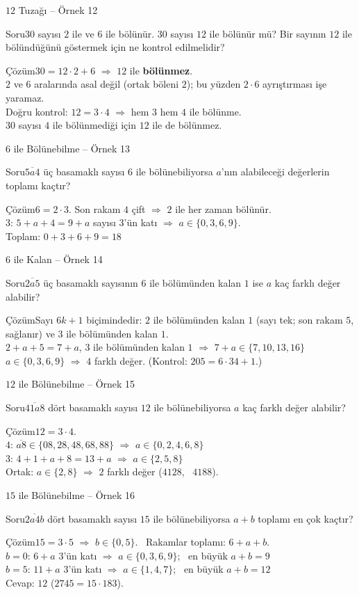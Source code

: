 \documentclass[aspectratio=169,11pt]{beamer}
\newcommand{\soru}[3]{%
\begin{frame}{#1}
  \begin{block}{Soru}\large #2\end{block}
  \pause
  \begin{exampleblock}{Çözüm}\large #3\end{exampleblock}
\end{frame}}
\newcommand{\ab}[1]{\overline{#1}}
\begin{document}
\soru{\(12\) Tuzağı -- Örnek 12}
{\(30\) sayısı \(2\) ile ve \(6\) ile bölünür. \(30\) sayısı \(12\) ile bölünür mü? Bir sayının \(12\) ile bölündüğünü göstermek için ne kontrol edilmelidir?}
{\(30=12\cdot 2+6\) \(\Rightarrow\) \(12\) ile \textbf{bölünmez}.\\[3pt]
\(2\) ve \(6\) aralarında asal değil (ortak böleni \(2\)); bu yüzden \(2\cdot 6\) ayrıştırması işe yaramaz.\\[3pt]
Doğru kontrol: \(12=3\cdot 4\) \(\Rightarrow\) hem \(3\) hem \(4\) ile bölünme.\\
\(30\) sayısı \(4\) ile bölünmediği için \(12\) ile de bölünmez.}

\soru{\(6\) ile Bölünebilme -- Örnek 13}
{\(\ab{5a4}\) üç basamaklı sayısı \(6\) ile bölünebiliyorsa \(a\)'nın alabileceği değerlerin toplamı kaçtır?}
{\(6=2\cdot 3\). Son rakam \(4\) çift \(\Rightarrow\) \(2\) ile her zaman bölünür.\\[3pt]
\(3\): \(5+a+4=9+a\) sayısı \(3\)'ün katı \(\Rightarrow\) \(a\in\{0,3,6,9\}\).\\[3pt]
Toplam: \(0+3+6+9=18\)}

\soru{\(6\) ile Kalan -- Örnek 14}
{\(\ab{2a5}\) üç basamaklı sayısının \(6\) ile bölümünden kalan \(1\) ise \(a\) kaç farklı değer alabilir?}
{Sayı \(6k+1\) biçimindedir: \(2\) ile bölümünden kalan \(1\) (sayı tek; son rakam \(5\), sağlanır) ve \(3\) ile bölümünden kalan \(1\).\\[3pt]
\(2+a+5=7+a\), \(3\) ile bölümünden kalan \(1\) \(\Rightarrow\) \(7+a\in\{7,10,13,16\}\)\\[3pt]
\(a\in\{0,3,6,9\}\) \(\Rightarrow\) \(4\) farklı değer. \quad (Kontrol: \(205=6\cdot 34+1\).)}

\soru{\(12\) ile Bölünebilme -- Örnek 15}
{\(\ab{41a8}\) dört basamaklı sayısı \(12\) ile bölünebiliyorsa \(a\) kaç farklı değer alabilir?}
{\(12=3\cdot 4\).\\[3pt]
\(4\): \(\ab{a8}\in\{08,28,48,68,88\}\) \(\Rightarrow\) \(a\in\{0,2,4,6,8\}\)\\[3pt]
\(3\): \(4+1+a+8=13+a\) \(\Rightarrow\) \(a\in\{2,5,8\}\)\\[3pt]
Ortak: \(a\in\{2,8\}\) \(\Rightarrow\) \(2\) farklı değer \quad (\(4128\), \ \(4188\)).}

\soru{\(15\) ile Bölünebilme -- Örnek 16}
{\(\ab{2a4b}\) dört basamaklı sayısı \(15\) ile bölünebiliyorsa \(a+b\) toplamı en çok kaçtır?}
{\(15=3\cdot 5\) \(\Rightarrow\) \(b\in\{0,5\}\). \ Rakamlar toplamı: \(6+a+b\).\\[3pt]
\(b=0\): \(6+a\) \(3\)'ün katı \(\Rightarrow\) \(a\in\{0,3,6,9\}\); \ en büyük \(a+b=9\)\\[3pt]
\(b=5\): \(11+a\) \(3\)'ün katı \(\Rightarrow\) \(a\in\{1,4,7\}\); \ en büyük \(a+b=12\)\\[3pt]
Cevap: \(12\) \quad (\(2745=15\cdot 183\)).}
\end{document}
